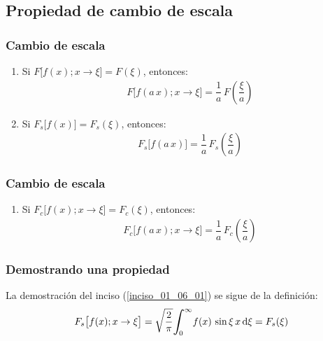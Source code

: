 \subsection{Propiedad de cambio de escala}

\begin{frame}
\frametitle{Cambio de escala}
\begin{enumerate}[<+->]
\item Si $F \big[ f (x); x \to \xi \big] = F (\xi)$, entonces:
\pause
\begin{align*}
F \big[ f (a \, x); x \to \xi \big] = \dfrac{1}{a} \, F \left( \dfrac{\xi}{a} \right)
\end{align*}
\item \label{inciso_01_06_01} Si $F_{s} \big[ f (x) \big] = F_{s}(\xi)$, entonces:
\pause
\begin{align*}
F_{s} \big[f (a \, x) \big] = \dfrac{1}{a} \, F_{s} \left( \dfrac{\xi}{a} \right)
\end{align*}
\seti
\end{enumerate}
\end{frame}
\begin{frame}
\frametitle{Cambio de escala}
\begin{enumerate}[<+->]
\conti
\item Si $F_{c} \big[ f (x); x \to \xi \big] = F_{c}(\xi)$, entonces:
\pause
\begin{align*}
F_{c} \big[ f (a \, x); x \to \xi \big] = \dfrac{1}{a} \, F_{c} \left( \dfrac{\xi}{a} \right)
\end{align*}
\end{enumerate}
\end{frame}
\begin{frame}
\frametitle{Demostrando una propiedad}
La demostración del inciso (\ref{inciso_01_06_01}) se sigue de la definición:
\pause
\begin{align*}
F_{s} \big[ f (x); x \to \xi \big] = \sqrt{\dfrac{2}{\pi}} \scaleint{6ex}_{\bs 0}^{\infty} f (x) \, \sin \xi \, x \dd{\xi} = F_{s} (\xi)
\end{align*}
\end{frame}
